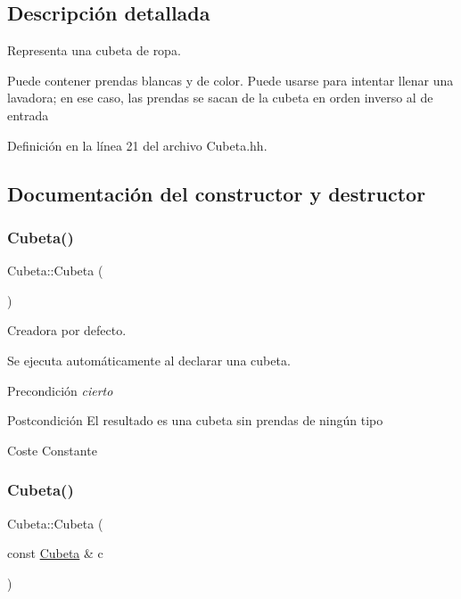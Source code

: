 \subsection{Descripción detallada}
Representa una cubeta de ropa. 

Puede contener prendas blancas y de color. Puede usarse para intentar llenar una lavadora; en ese caso, las prendas se sacan de la cubeta en orden inverso al de entrada 

Definición en la línea 21 del archivo Cubeta.\+hh.



\subsection{Documentación del constructor y destructor}
\mbox{\label{class_cubeta_ae85e70c9cd67454446439891e3f435e1}} 
\subsubsection{\texorpdfstring{Cubeta()}{Cubeta()}\hspace{0.1cm}{\footnotesize\ttfamily [1/2]}}
{\footnotesize\ttfamily Cubeta\+::\+Cubeta (\begin{DoxyParamCaption}{ }\end{DoxyParamCaption})}



Creadora por defecto. 

Se ejecuta automáticamente al declarar una cubeta. \begin{DoxyPrecond}{Precondición}
{\itshape cierto} 
\end{DoxyPrecond}
\begin{DoxyPostcond}{Postcondición}
El resultado es una cubeta sin prendas de ningún tipo 
\end{DoxyPostcond}
\begin{DoxyParagraph}{Coste Constante}

\end{DoxyParagraph}
\mbox{\label{class_cubeta_a9615e48038899c5732f61661585f12c7}} 
\subsubsection{\texorpdfstring{Cubeta()}{Cubeta()}\hspace{0.1cm}{\footnotesize\ttfamily [2/2]}}
{\footnotesize\ttfamily Cubeta\+::\+Cubeta (\begin{DoxyParamCaption}\item[{const \mbox{\hyperlink{class_cubeta}{Cubeta}} \&}]{c }\end{DoxyParamCaption})}



